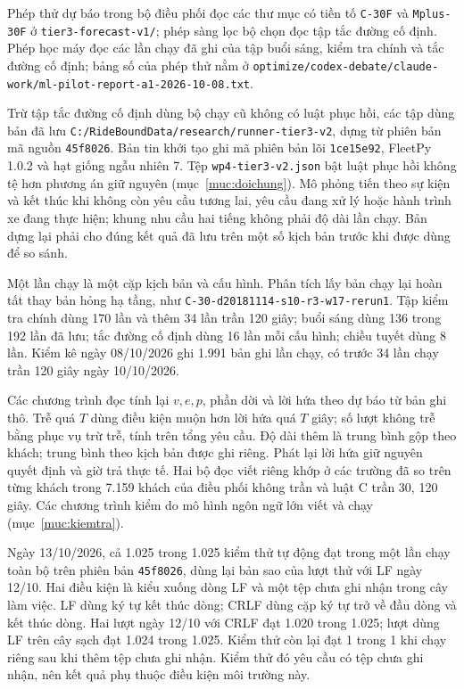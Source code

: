 Phép thử dự báo trong bộ điều phối đọc các thư mục có tiền tố \texttt{C-30F} và \texttt{Mplus-30F} ở \nolinkurl{tier3-forecast-v1/}; phép sàng lọc bộ chọn đọc tập tắc đường cố định. Phép học máy đọc các lần chạy đã ghi của tập buổi sáng, kiểm tra chính và tắc đường cố định; bảng số của phép thử nằm ở \nolinkurl{optimize/codex-debate/claude-work/ml-pilot-report-a1-2026-10-08.txt}.

Trừ tập tắc đường cố định dùng bộ chạy cũ không có luật phục hồi, các tập dùng bản đã lưu \nolinkurl{C:/RideBoundData/research/runner-tier3-v2}, dựng từ phiên bản mã nguồn \texttt{45f8026}. Bản tin khởi tạo ghi mã phiên bản lõi \texttt{1ce15e92}, FleetPy 1.0.2 và hạt giống ngẫu nhiên 7. Tệp \nolinkurl{wp4-tier3-v2.json} bật luật phục hồi không tệ hơn phương án giữ nguyên (mục~\ref{muc:doichung}). Mô phỏng tiến theo sự kiện và kết thúc khi không còn yêu cầu tương lai, yêu cầu đang xử lý hoặc hành trình xe đang thực hiện; khung nhu cầu hai tiếng không phải độ dài lần chạy. Bản dựng lại phải cho đúng kết quả đã lưu trên một số kịch bản trước khi được dùng để so sánh.

Một lần chạy là một cặp kịch bản và cấu hình. Phân tích lấy bản chạy lại hoàn tất thay bản hỏng hạ tầng, như \nolinkurl{C-30-d20181114-s10-r3-w17-rerun1}. Tập kiểm tra chính dùng 170 lần và thêm 34 lần trần 120 giây; buổi sáng dùng 136 trong 192 lần đã lưu; tắc đường cố định dùng 16 lần mỗi cấu hình; chiều tuyết dùng 8 lần. Kiểm kê ngày 08/10/2026 ghi 1.991 bản ghi lần chạy, có trước 34 lần chạy trần 120 giây ngày 10/10/2026.

Các chương trình đọc tính lại $v,e,p$, phần dời và lời hứa theo dự báo từ bản ghi thô. Trễ quá $T$ dùng điều kiện muộn hơn lời hứa quá $T$ giây; số lượt không trễ bằng phục vụ trừ trễ, tính trên tổng yêu cầu. Độ dài thêm là trung bình gộp theo khách; trung bình theo kịch bản được ghi riêng. Phát lại lời hứa giữ nguyên quyết định và giờ trả thực tế. Hai bộ đọc viết riêng khớp ở các trường đã so trên từng khách trong 7.159 khách của điều phối không trần và luật C trần 30, 120 giây. Các chương trình kiểm do mô hình ngôn ngữ lớn viết và chạy (mục~\ref{muc:kiemtra}).

Ngày 13/10/2026, cả 1.025 trong 1.025 kiểm thử tự động đạt trong một lần chạy toàn bộ trên phiên bản \texttt{45f8026}, dùng lại bản sao của lượt thử với LF ngày 12/10. Hai điều kiện là kiểu xuống dòng LF và một tệp chưa ghi nhận trong cây làm việc. LF dùng ký tự kết thúc dòng; CRLF dùng cặp ký tự trở về đầu dòng và kết thúc dòng. Hai lượt ngày 12/10 với CRLF đạt 1.020 trong 1.025; lượt dùng LF trên cây sạch đạt 1.024 trong 1.025. Kiểm thử còn lại đạt 1 trong 1 khi chạy riêng sau khi thêm tệp chưa ghi nhận. Kiểm thử đó yêu cầu có tệp chưa ghi nhận, nên kết quả phụ thuộc điều kiện môi trường này.
